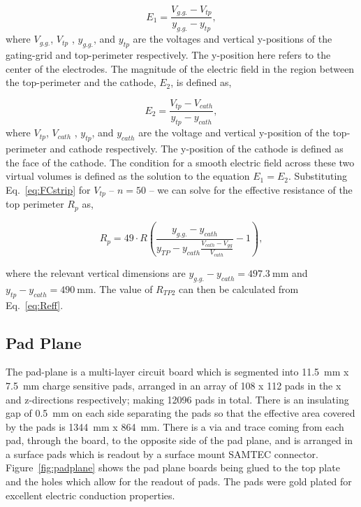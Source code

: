 \begin{equation}
E_1 = \frac{V_{g.g.} - V_{tp}}{ y_{g.g.} - y_{tp} },
\end{equation}
where  $V_{g.g.}$, $V_{tp}$ , $y_{g.g.}$, and $y_{tp}$ are the voltages and vertical y-positions of the gating-grid and top-perimeter respectively. The y-position here refers to the center of the electrodes. The magnitude of the electric field in the region between the top-perimeter and the cathode, $E_2$, is defined as,

\begin{equation}
E_2 = \frac{V_{tp} - V_{cath}}{ y_{tp} - y_{cath} },
\end{equation}
where  $V_{tp}$, $V_{cath}$ , $y_{tp}$, and $y_{cath}$ are the voltage and vertical y-position of the top-perimeter and cathode respectively. The y-position of the cathode is defined as the face of the cathode. The condition for a smooth electric field across these two virtual volumes is defined as the solution to the equation $E_1 = E_2$. Substituting Eq.~\ref{eq:FCstrip} for $V_{tp}$ -- $n=50$ -- we can solve for the effective resistance of the top perimeter $R_p$ as, 

\begin{equation}
R_p = 49 \cdot R  \left(\frac{ y_{g.g.} - y_{cath} }{ y_{TP} - y_{cath} \frac{V_{cath} - V_{gg}}{V_{cath}} }- 1 \right),
\label{eq:TP_resistor}
\end{equation}

where the relevant vertical dimensions are $y_{g.g.} - y_{cath} = \SI{497.3}{\milli\metre}$ and $y_{tp} - y_{cath} = \SI{490}{\milli\metre}$. The value of $R_{TP2}$ can then be calculated from Eq.~\ref{eq:Reff}.


\subsection{Pad Plane}
The pad-plane is a multi-layer circuit board which is segmented into \SI{11.5}{\milli\metre} x \SI{7.5}{\milli\metre} charge sensitive pads, arranged in an array of 108 x 112 pads in the x and z-directions respectively; making 12096 pads in total. There is an insulating gap of \SI{0.5}{\milli\metre} on each side separating the pads so that the effective area covered by the pads is \SI{1344}{\milli\metre} x \SI{864}{\milli\metre}. There is a via and trace coming from each pad, through the board, to the opposite side of the pad plane, and is arranged in a surface pads which is readout by a surface mount SAMTEC connector. Figure~\ref{fig:padplane} shows the pad plane boards being glued to the top plate and the holes which allow for the readout of pads. The pads were gold plated for excellent electric conduction properties. 

